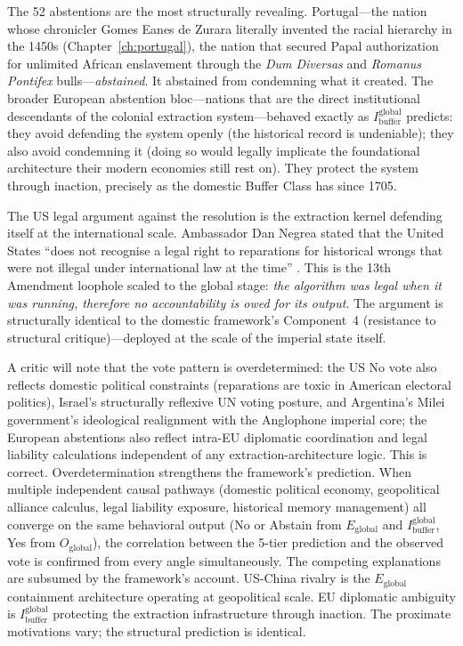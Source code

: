 The 52 abstentions are the most structurally revealing. Portugal---the nation whose chronicler Gomes Eanes de Zurara literally invented the racial hierarchy in the 1450s (Chapter~\ref{ch:portugal}), the nation that secured Papal authorization for unlimited African enslavement through the \textit{Dum Diversas} and \textit{Romanus Pontifex} bulls---\textit{abstained}. It abstained from condemning what it created. The broader European abstention bloc---nations that are the direct institutional descendants of the colonial extraction system---behaved exactly as $I_{\text{buffer}}^{\text{global}}$ predicts: they avoid defending the system openly (the historical record is undeniable); they also avoid condemning it (doing so would legally implicate the foundational architecture their modern economies still rest on). They protect the system through inaction, precisely as the domestic Buffer Class has since 1705.

The US legal argument against the resolution is the extraction kernel defending itself at the international scale. Ambassador Dan Negrea stated that the United States ``does not recognise a legal right to reparations for historical wrongs that were not illegal under international law at the time'' \cite{unreparations2026}. This is the 13th Amendment loophole scaled to the global stage: \textit{the algorithm was legal when it was running, therefore no accountability is owed for its output}. The argument is structurally identical to the domestic framework's Component~4 (resistance to structural critique)---deployed at the scale of the imperial state itself.

A critic will note that the vote pattern is overdetermined: the US No vote also reflects domestic political constraints (reparations are toxic in American electoral politics), Israel's structurally reflexive UN voting posture, and Argentina's Milei government's ideological realignment with the Anglophone imperial core; the European abstentions also reflect intra-EU diplomatic coordination and legal liability calculations independent of any extraction-architecture logic. This is correct. Overdetermination strengthens the framework's prediction. When multiple independent causal pathways (domestic political economy, geopolitical alliance calculus, legal liability exposure, historical memory management) all converge on the same behavioral output (No or Abstain from $E_{\text{global}}$ and $I_{\text{buffer}}^{\text{global}}$, Yes from $O_{\text{global}}$), the correlation between the 5-tier prediction and the observed vote is confirmed from every angle simultaneously. The competing explanations are subsumed by the framework's account. US-China rivalry is the $E_{\text{global}}$ containment architecture operating at geopolitical scale. EU diplomatic ambiguity is $I_{\text{buffer}}^{\text{global}}$ protecting the extraction infrastructure through inaction. The proximate motivations vary; the structural prediction is identical.

